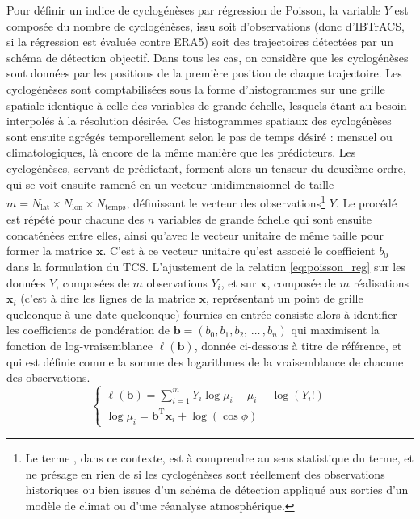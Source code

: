 \documentclass[../main.tex]{subfiles}
\begin{document}
Pour définir un indice de cyclogénèses par régression de Poisson, la variable $Y$ est composée du nombre de cyclogénèses, issu soit d'observations (donc
d'IBTrACS, si la régression est évaluée contre ERA5) soit des trajectoires détectées par un schéma de détection objectif. Dans tous les cas, on considère que
les cyclogénèses sont données par les positions de la première position de chaque trajectoire. Les cyclogénèses sont comptabilisées sous la forme d'histogrammes
sur une grille spatiale identique à celle des variables de grande échelle, lesquels étant au besoin interpolés à la résolution désirée. Ces histogrammes spatiaux des
cyclogénèses sont ensuite agrégés temporellement selon le pas de temps désiré : mensuel ou climatologiques, là encore de la même manière que les prédicteurs.
Les cyclogénèses, servant de prédictant, forment alors un tenseur du deuxième ordre, qui se voit ensuite ramené en un vecteur unidimensionnel de taille $m =
N_{\mathrm{lat}} \times N_{\mathrm{lon}} \times N_{\mathrm{temps}}$, définissant le vecteur des observations\footnote{Le terme , dans ce
contexte, est à comprendre au sens statistique du terme, et ne présage en rien de si les cyclogénèses sont réellement des observations historiques ou bien
issues d'un schéma de détection appliqué aux sorties d'un modèle de climat ou d'une réanalyse atmosphérique.} $Y$. Le procédé est répété pour chacune des $n$
variables de grande échelle qui sont ensuite concaténées entre elles, ainsi qu'avec le vecteur unitaire de même taille pour former la matrice $\mathbf{x}$.
C'est à ce vecteur unitaire qu'est associé le coefficient $b_0$ dans la formulation du TCS. L'ajustement de la relation \ref{eq:poisson_reg} sur les données
$Y$, composées de $m$ observations $Y_i$, et sur $\mathbf{x}$, composée de $m$ réalisations $\mathbf{x}_i$ (c'est à dire les lignes de la matrice $\mathbf{x}$,
représentant un point de grille quelconque à une date quelconque) fournies en entrée consiste alors à identifier les coefficients de pondération de $\mathbf{b}
= (b_0, b_1, b_2, \, \ldots \, , b_n)$ qui maximisent la fonction de log-vraisemblance $\ell (\mathbf{b})$, donnée ci-dessous à titre de référence, et qui est
définie comme la somme des logarithmes de la vraisemblance de chacune des observations.
%
\begin{equation*}
    \begin{cases}
        \ell(\mathbf{b}) = \sum_{i = 1}^{m} Y_i \log \mu_i - \mu_i - \log(Y_i !) \\
        \log \mu_i = \mathbf{b}^{\mathrm{T}} \mathbf{x}_i + \log ( \cos \phi )
    \end{cases}
\end{equation*}
\end{document}
